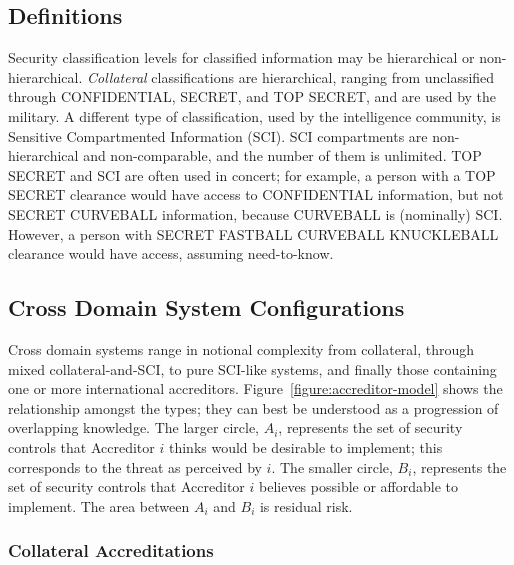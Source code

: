 \documentclass[10pt,letterpaper,conference]{IEEEtran}
\begin{document}
\subsection{Definitions}

Security classification levels for classified information may be hierarchical or non-hierarchical.
\emph{Collateral} classifications are hierarchical, ranging from unclassified through CONFIDENTIAL,
SECRET, and TOP SECRET, and are used by the military.  A different type of classification, used by
the intelligence community, is Sensitive Compartmented Information (SCI).  SCI compartments are
non-hierarchical and non-comparable, and the number of them is unlimited.  TOP SECRET and SCI are
often used in concert; for example, a person with a TOP SECRET clearance would have access to
CONFIDENTIAL information, but not SECRET CURVEBALL information, because CURVEBALL is (nominally)
SCI.  However, a person with SECRET FASTBALL CURVEBALL KNUCKLEBALL clearance would have access,
assuming need-to-know.

\subsection{Cross Domain System Configurations}

Cross domain systems range in notional complexity from collateral, through mixed collateral-and-SCI,
to pure SCI-like systems, and finally those containing one or more international accreditors.
Figure~\ref{figure:accreditor-model} shows the relationship amongst the types; they can best be
understood as a progression of overlapping knowledge.  The larger circle, $A_i$, represents the set
of security controls that Accreditor $i$ thinks would be desirable to implement; this
corresponds to the threat as perceived by $i$.  The smaller circle, $B_i$, represents the set of
security controls that Accreditor $i$ believes possible or affordable to implement.  The area
between $A_i$ and $B_i$ is residual risk.

\subsubsection{Collateral Accreditations}
\end{document}
